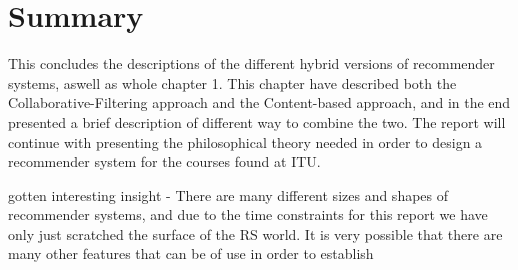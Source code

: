 \section{Summary}




This concludes the descriptions of the different hybrid versions of recommender systems, aswell as whole chapter 1. This chapter have described both the Collaborative-Filtering approach and the Content-based approach, and in the end presented a brief description of different way to combine the two. The report will continue with presenting the philosophical theory needed in order to design a recommender system for the courses found at ITU.

gotten interesting insight
- There are many different sizes and shapes of recommender systems, and due to the time constraints for this report we have only just scratched the surface of the RS world. It is very possible that there are many other features that can be of use in order to establish 